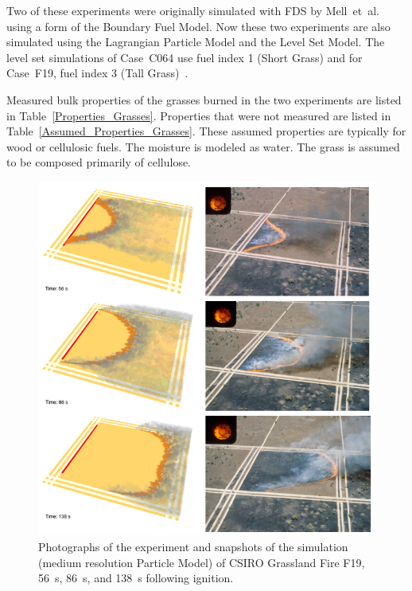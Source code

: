 \documentclass[journal,article,atmosphere,submit,moreauthors,pdftex]{Definitions_Review_Process/mdpi}
\begin{document}
Two of these experiments were originally simulated with FDS by Mell~et~al.~\cite{Mell:IJWF2007} using a form of the Boundary Fuel Model. Now these two experiments are also simulated using the Lagrangian Particle Model and the Level Set Model. The level set simulations of Case~C064 use fuel index 1 (Short Grass) and for Case~F19, fuel index 3 (Tall Grass)~\cite{Rothermel:1972,Albini:1976}.

Measured bulk properties of the grasses burned in the two experiments are listed in Table~\ref{Properties_Grasses}. Properties that were not measured are listed in Table~\ref{Assumed_Properties_Grasses}. These assumed properties are typically for wood or cellulosic fuels. The moisture is modeled as water. The grass is assumed to be composed primarily of cellulose.

\begin{figure}[p]
\includegraphics[width=\textwidth]{figures/F19_collage.png}
\caption{Photographs of the experiment and snapshots of the simulation (medium resolution Particle Model) of CSIRO Grassland Fire F19, 56~s, 86~s, and 138~s following ignition.}
\label{F19}
\end{figure}
\end{document}
